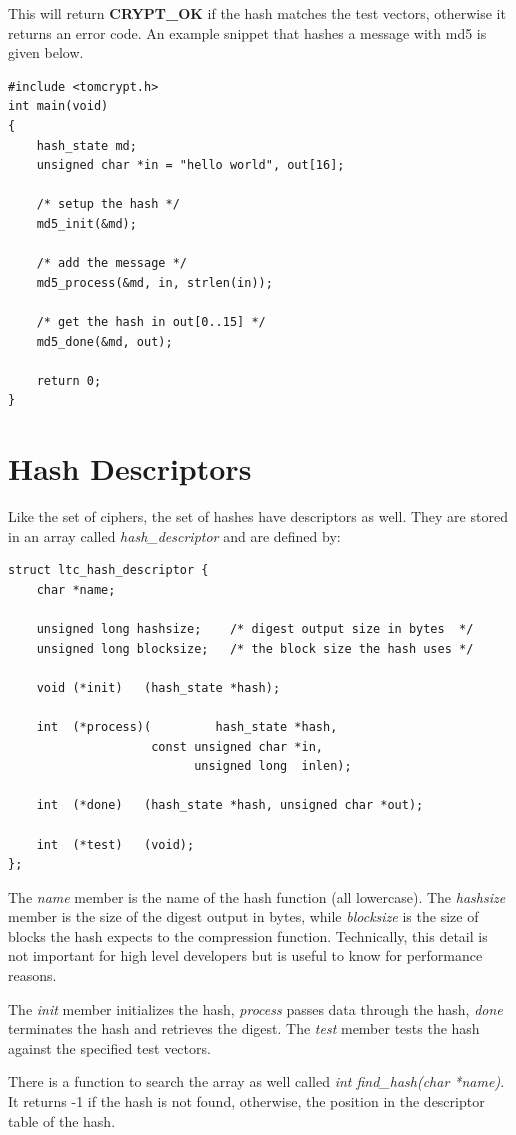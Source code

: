 \documentclass[synpaper]{book}
\newcommand{\mysection}[1]    %
	{                   %
	\section{#1}
   \markboth{\textsf{www.libtom.net}}{\thesection ~ {#1}}
	}
\begin{document}
This will return {\bf CRYPT\_OK} if the hash matches the test vectors, otherwise it returns an error code.  An
example snippet that hashes a message with md5 is given below.
\begin{small}
\begin{verbatim}
#include <tomcrypt.h>
int main(void)
{
    hash_state md;
    unsigned char *in = "hello world", out[16];

    /* setup the hash */
    md5_init(&md);

    /* add the message */
    md5_process(&md, in, strlen(in));

    /* get the hash in out[0..15] */
    md5_done(&md, out);

    return 0;
}
\end{verbatim}
\end{small}

\mysection{Hash Descriptors}
Like the set of ciphers, the set of hashes have descriptors as well.  They are stored in an array called \textit{hash\_descriptor} and
are defined by:
\begin{verbatim}
struct ltc_hash_descriptor {
    char *name;

    unsigned long hashsize;    /* digest output size in bytes  */
    unsigned long blocksize;   /* the block size the hash uses */

    void (*init)   (hash_state *hash);

    int  (*process)(         hash_state *hash,
                    const unsigned char *in,
                          unsigned long  inlen);

    int  (*done)   (hash_state *hash, unsigned char *out);

    int  (*test)   (void);
};
\end{verbatim}

The \textit{name} member is the name of the hash function (all lowercase).  The \textit{hashsize} member is the size of the digest output
in bytes, while \textit{blocksize} is the size of blocks the hash expects to the compression function.  Technically, this detail is not important
for high level developers but is useful to know for performance reasons.

The \textit{init} member initializes the hash, \textit{process} passes data through the hash, \textit{done} terminates the hash and retrieves the
digest.  The \textit{test} member tests the hash against the specified test vectors.

There is a function to search the array as well called \textit{int find\_hash(char *name)}.  It returns -1 if the hash is not found, otherwise, the
position in the descriptor table of the hash.
\end{document}
